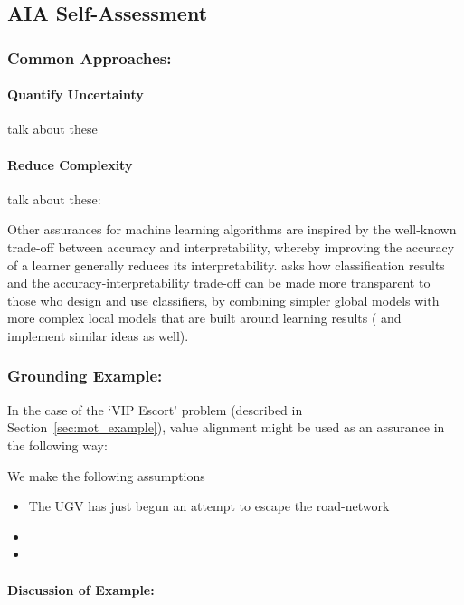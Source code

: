 \subsection{AIA Self-Assessment} \label{sec:aia_self_assessment}

\subsubsection{Common Approaches:}
\paragraph{Quantify Uncertainty} \label{sec:QU}
talk about these \citet{Wu2012-qi, Chen2018-xq, Choi2017-th, Kahn2017-vy, Peterson2017-dd, Kendall2017-ry, Zhang2014-he, Churchill2015-ei, Paul2011-vr, Grimmett2013-gj, Triebel2013-ku, Triebel2013-ow, Triebel2016-kj, Berczi2015-rd, Grimmett2016-yc, Dequaire2016-kh, Gurau2016-hs, Kuter2015-qh, Aitken2016-cv, MacKay1992-sp, Zagorecki2015-qy, Hutchins2015-if, Laskey1991-mf, Kaipa2015-hy, Habbema1976-xd}

\paragraph{Reduce Complexity} \label{sec:reduce_complexity}
talk about these: \citet{Liu2017-xw, Strumbelj2018-ou, Pynadath2018-ck, Abdollahi2018-uw, Robnik-Sikonja2018-jz, Browne2018-me, Huang2017-lk, Wang2018-br, Hayes2017-nt, Huang2017-zt, Olah2018-rp, Kuhn1997-qc, Rouse1986-dz, Swartout1983-ko, Wang2016-id, Kaniarasu2013-ho, Wallace2001-fm, Aitken2016-cv, Lacave2002-cu, Ribeiro2016-uc}

Other assurances for machine learning algorithms are inspired by the well-known trade-off between accuracy and interpretability, whereby improving the accuracy of a learner generally reduces its interpretability. \citet{Ruping2006-xj} asks how classification results and the accuracy-interpretability trade-off can be made more transparent to those who design and use classifiers, by combining simpler global models with more complex local models that are built around learning results (\citet{Otte2013-oo} and \citet{Ribeiro2016-uc} implement similar ideas as well). 

\subsubsection{Grounding Example:}
In the case of the `VIP Escort' problem (described in Section~\ref{sec:mot_example}), value alignment might be used as an assurance in the following way:

We make the following assumptions

\begin{itemize}
    \item The UGV has just begun an attempt to escape the road-network
    \item 
    \item 
\end{itemize}

\paragraph{\textbf{Discussion of Example:}} 
